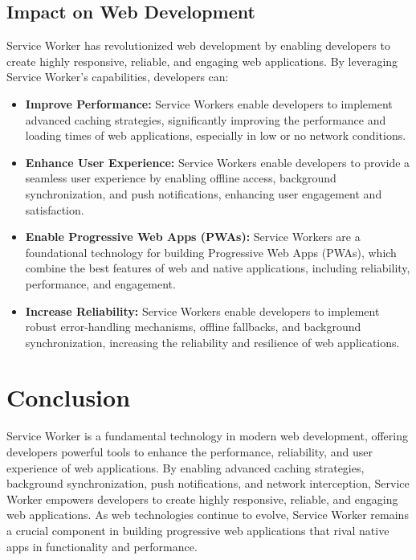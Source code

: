 \documentclass[12pt, a4paper, twoside]{article}
\begin{document}
\subsection{Impact on Web Development}
\label{subsec:sw-impact}

Service Worker has revolutionized web development by enabling developers to create highly responsive, reliable, and engaging web applications. By leveraging Service Worker's capabilities, developers can:

\begin{itemize}
  \item \textbf{Improve Performance:} Service Workers enable developers to implement advanced caching strategies, significantly improving the performance and loading times of web applications, especially in low or no network conditions.
  
  \item \textbf{Enhance User Experience:} Service Workers enable developers to provide a seamless user experience by enabling offline access, background synchronization, and push notifications, enhancing user engagement and satisfaction.
  
  \item \textbf{Enable Progressive Web Apps (PWAs):} Service Workers are a foundational technology for building Progressive Web Apps (PWAs), which combine the best features of web and native applications, including reliability, performance, and engagement.
  
  \item \textbf{Increase Reliability:} Service Workers enable developers to implement robust error-handling mechanisms, offline fallbacks, and background synchronization, increasing the reliability and resilience of web applications.
\end{itemize}

\newpage

\section{Conclusion}
\label{sec:conclusion}

Service Worker is a fundamental technology in modern web development, offering developers powerful tools to enhance the performance, reliability, and user experience of web applications. By enabling advanced caching strategies, background synchronization, push notifications, and network interception, Service Worker empowers developers to create highly responsive, reliable, and engaging web applications. As web technologies continue to evolve, Service Worker remains a crucial component in building progressive web applications that rival native apps in functionality and performance.
\end{document}
